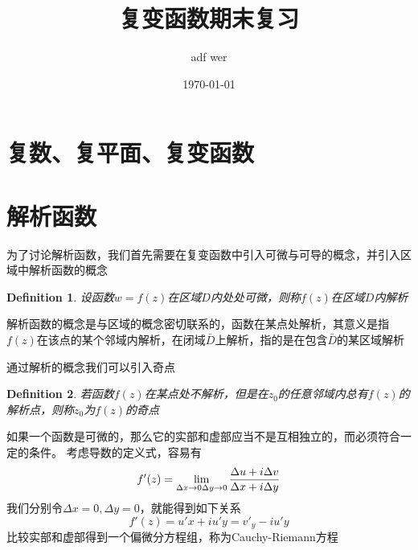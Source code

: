 \documentclass{ctexart}
\title{复变函数期末复习}
\author{adf wer}
\date{\today}
\begin{document}
\maketitle

\renewcommand{\proofname}{\indent\bf Proof}
\newcommand{\C}{\mathbb{C}}
\newcommand{\R}{\mathbb{R}}
\newcommand{\IM}{\mathbb{Im}}
\newcommand{\Ker}{\mathbb{Ker}}
\newcommand{\rd}{\mathrm{d}}

\newtheorem{definition}{Definition}
\newtheorem{theorem}{Theorem}
\newtheorem{lemma}{Lemma}

\newtheorem{remark}{Remark}
\newtheorem{proposition}{Proposition}
\newtheorem{corollary}{Corollary}
\newtheorem{example}{Example}
\newtheorem{solution}{Solution}

\section{复数、复平面、复变函数}

\section{解析函数}

为了讨论解析函数，我们首先需要在复变函数中引入可微与可导的概念，并引入区域中解析函数的概念
\begin{definition}
    设函数$w = f(z)$在区域$D$内处处可微，则称$f(z)$在区域$D$内解析
\end{definition}

解析函数的概念是与区域的概念密切联系的，函数在某点处解析，其意义是指 $f(z)$在该点的某个邻域内解析，在闭域$\bar D$上解析，指的是在包含$\bar D$的某区域解析

通过解析的概念我们可以引入奇点
\begin{definition}
    若函数$f(z)$在某点处不解析，但是在$z_0$的任意邻域内总有$f(z)$的解析点，则称$z_0$为$f(z)$的奇点
\end{definition}

如果一个函数是可微的，那么它的实部和虚部应当不是互相独立的，而必须符合一定的条件。
考虑导数的定义式，容易有
\begin{equation*}
    f'(z) = \lim_{\Delta x \to 0 \\ \Delta y \to 0}\frac{\Delta u + i \Delta v}{\Delta x + i \Delta y}
\end{equation*}
我们分别令$\Delta x = 0, \Delta y = 0$，就能得到如下关系
\begin{equation*}
    f'(z) = u'x + i u'y = v'_y - i u'y
\end{equation*}
比较实部和虚部得到一个偏微分方程组，称为Cauchy-Riemann方程
\end{document}
